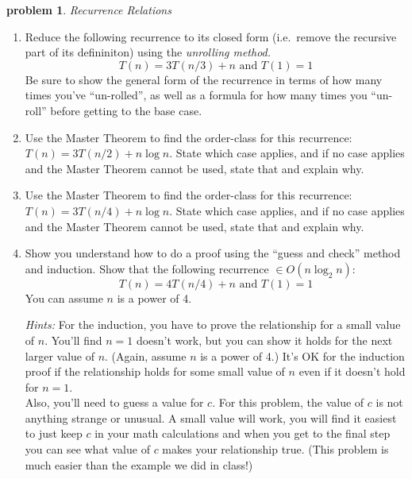 \documentclass[10pt]{article}
\newtheorem{problem}{\sc\color{cit}problem}
\begin{document}
\begin{problem} Recurrence Relations \end{problem}
      \begin{enumerate}   
    
    	\item Reduce the following recurrence to its closed form (i.e.\ remove the recursive part of its defininiton) using the \emph{unrolling method.}
    	$$T(n) = 3 T(n/3) + n \textrm{ and } T(1) = 1$$
    	Be sure to show the general form of the recurrence in terms of how many times you've ``un-rolled'', as well as a formula for how many times you ``un-roll'' before getting to the base case.
    
    	\item Use the Master Theorem to find the order-class for this recurrence: $T(n) = 3 T (n/2) + n \log n$.  State which case applies, and if no case applies and the Master Theorem cannot be used, state that and explain why.

    	\item Use the Master Theorem to find the order-class for this recurrence: $T(n) = 3 T (n/4) + n \log n$.  State which case applies, and if no case applies and the Master Theorem cannot be used, state that and explain why.
    	
    	\item Show you understand how to do a proof using the ``guess and check'' method and induction.   Show that the following recurrence $\in O(n \log_2 n)$:
    	$$T(n) = 4 T(n/4) + n \textrm{ and } T(1) = 1$$ 
    	You can assume $n$ is a power of 4.
    	
    	\emph{Hints:} For the induction, you have to prove the relationship for a small value of $n$.  You'll find $n=1$ doesn't work, but you can show it holds for the
    	next larger value of $n$.  (Again, assume $n$ is a power of 4.) It's OK for the induction proof if the relationship holds for some small value of $n$ even
    	if it doesn't hold for $n=1$.\\
    	Also, you'll need to guess a value for $c$. For this problem, the value of $c$ is not anything strange or unusual.  A small value will work, you will find it easiest to just keep $c$ in your math calculations and when you get to the final step you can see what value of $c$ makes your relationship true. 
    	(This problem is much easier than the example we did in class!) 
    	
      \end{enumerate}   
\end{document}
